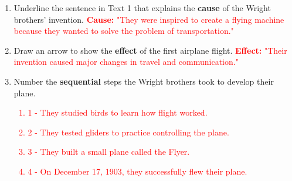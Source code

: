 \documentclass[12pt]{article}
\begin{document}
\begin{tcolorbox}[colframe=black!60, colback=white, 
coltitle=black, colbacktitle=black!15, fonttitle=\bfseries\Large, 
title=Guided Practice, halign title=center, left=10pt, right=10pt, top=10pt, bottom=15pt]
\begin{enumerate}[itemsep=3em]
    \item Underline the sentence in Text 1 that explains the \textbf{cause} of the Wright brothers’ invention.  
    \textcolor{red}{\textbf{Cause:} "They were inspired to create a flying machine because they wanted to solve the problem of transportation."}

    \item Draw an arrow to show the \textbf{effect} of the first airplane flight.  
    \textcolor{red}{\textbf{Effect:} "Their invention caused major changes in travel and communication."}

    \item Number the \textbf{sequential} steps the Wright brothers took to develop their plane.
    \textcolor{red}{
        \begin{enumerate}
            \item 1 - They studied birds to learn how flight worked.
            \item 2 - They tested gliders to practice controlling the plane.
            \item 3 - They built a small plane called the Flyer.
            \item 4 - On December 17, 1903, they successfully flew their plane.
        \end{enumerate}
    }
\end{enumerate}
\end{tcolorbox}

\vspace{1em}
\end{document}
